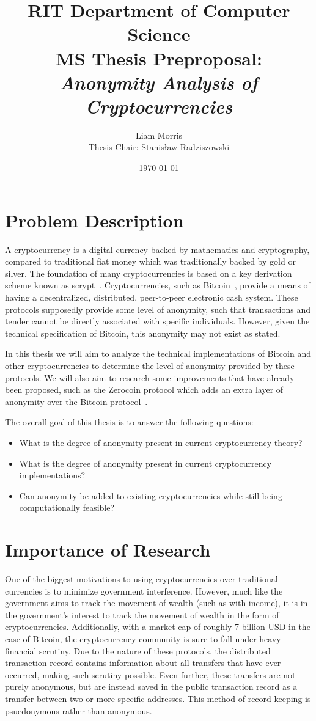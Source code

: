 \documentclass[11pt]{artikel3}
\title{RIT Department of Computer Science\\MS Thesis Preproposal:\\\emph{Anonymity Analysis of Cryptocurrencies}}
\author{Liam Morris\\Thesis Chair: Stanis{\l}aw Radziszowski}
\date{\today}
\begin{document}
\maketitle

\section{Problem Description}
A cryptocurrency is a digital currency backed by mathematics and
cryptography, compared to traditional fiat money which was traditionally backed by gold
or silver. The foundation of many cryptocurrencies is based on a key derivation
scheme known as scrypt~\cite{Percival}.
Cryptocurrencies, such as Bitcoin~\cite{Nakamoto08}, provide a means of having a
decentralized, distributed, peer-to-peer electronic cash system. These protocols
supposedly provide some level of anonymity, such that transactions and tender
cannot be directly associated with specific individuals. However, given the
technical specification of Bitcoin, this anonymity may not exist as stated.

In this thesis we will aim to analyze the technical implementations of Bitcoin and
other cryptocurrencies to determine the level of anonymity provided by these protocols. We will
also aim to research some improvements that have already been proposed, such as
the Zerocoin protocol which adds an extra layer of anonymity over the Bitcoin
protocol~\cite{Miers13}.

The overall goal of this thesis is to answer the following questions:
\begin{itemize}[leftmargin=.5in]
    \item What is the degree of anonymity present in current cryptocurrency theory?
    \item What is the degree of anonymity present in current cryptocurrency implementations?
    \item Can anonymity be added to existing cryptocurrencies while still being computationally feasible?
\end{itemize}

\section{Importance of Research}
One of the biggest motivations to using cryptocurrencies over traditional
currencies is to minimize government interference. However, much like the
government aims to track the movement of wealth (such as with income), it is
in the government's interest to track the movement of wealth in the form of
cryptocurrencies. Additionally, with a market cap of roughly 7 billion USD in
the case of Bitcoin, the cryptocurrency community is sure to fall under heavy
financial scrutiny. Due to the nature of these protocols, the distributed
transaction record contains information about all transfers that have ever
occurred, making such scrutiny possible. Even further, these transfers are not
purely anonymous, but are instead saved in the public transaction record as a
transfer between two or more specific addresses. This method of record-keeping
is psuedonymous rather than anonymous.
\end{document}
